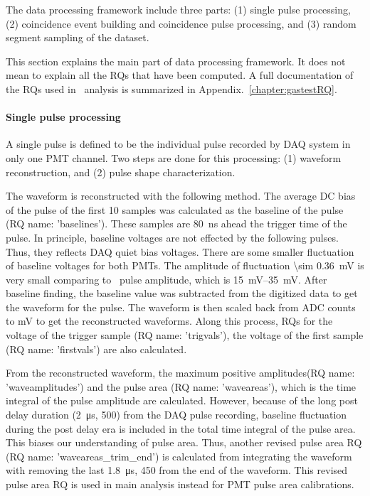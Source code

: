 The data processing framework include three parts: (1) single pulse processing, (2) coincidence event building and coincidence pulse processing, and (3) random segment sampling of the dataset.

This section explains the main part of data processing framework. It does not mean to explain all the RQs that have been computed. A full documentation of the RQs used in \gtest\ analysis is summarized in Appendix.~\ref{chapter:gastestRQ}.

\paragraph{Single pulse processing} A single pulse is defined to be the individual pulse recorded by DAQ system in only one PMT channel. Two steps are done for this processing: (1) waveform reconstruction, and (2) pulse shape characterization. 

The waveform is reconstructed with the following method. The average DC bias of the pulse of the first 10 samples was calculated as the baseline of the pulse (RQ name: 'baselines'). These samples are \SI{80}{\ns} ahead the trigger time of the pulse. In principle, baseline voltages are not effected by the following pulses. Thus, they reflects DAQ quiet bias voltages. There are some smaller fluctuation of baseline voltages for both PMTs. The amplitude of fluctuation \SI{\sim 0.36}{\mV} is very small comparing to \sphe\ pulse amplitude, which is \SIrange{15}{35}{\mV}. After baseline finding, the baseline value was subtracted from the digitized data to get the waveform for the pulse. The waveform is then scaled back from ADC counts to \si{\mV} to get the reconstructed waveforms. Along this process, RQs for the voltage of the trigger sample (RQ name: 'trigvals'), the voltage of the first sample (RQ name: 'firstvals') are also calculated.

From the reconstructed waveform, the maximum positive amplitudes(RQ name: 'waveamplitudes') and the pulse area (RQ name: 'waveareas'), which is the time integral of the pulse amplitude are calculated. However, because of the long post delay duration (\SI{2}{\us}, \SI{500}{\sample}) from the DAQ pulse recording, baseline fluctuation during the post delay era is included in the total time integral of the pulse area. This biases our understanding of pulse area. Thus, another revised pulse area RQ (RQ name: 'waveareas\_trim\_end') is calculated from integrating the waveform with removing the last \SI{1.8}{\us}, \SI{450}{\sample} from the end of the waveform. This revised pulse area RQ is used in main analysis instead for PMT pulse area calibrations. 

